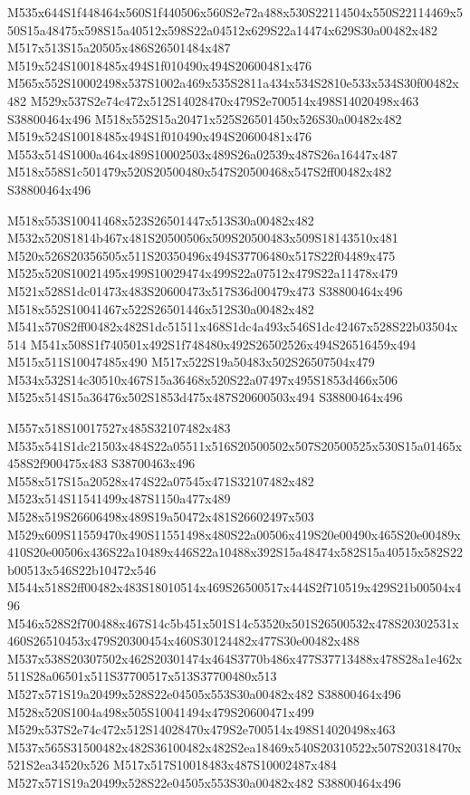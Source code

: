 \documentclass{article}
\begin{document}
\begin{multicols}{2}
M535x644S1f448464x560S1f440506x560S2e72a488x530S22114504x550S22114469x550S15a48475x598S15a40512x598S22a04512x629S22a14474x629S30a00482x482 M517x513S15a20505x486S26501484x487 M519x524S10018485x494S1f010490x494S20600481x476 M565x552S10002498x537S1002a469x535S2811a434x534S2810e533x534S30f00482x482 M529x537S2e74c472x512S14028470x479S2e700514x498S14020498x463 S38800464x496 M518x552S15a20471x525S26501450x526S30a00482x482 M519x524S10018485x494S1f010490x494S20600481x476 M553x514S1000a464x489S10002503x489S26a02539x487S26a16447x487 M518x558S1c501479x520S20500480x547S20500468x547S2ff00482x482 S38800464x496

M518x553S10041468x523S26501447x513S30a00482x482 M532x520S1814b467x481S20500506x509S20500483x509S18143510x481 M520x526S20356505x511S20350496x494S37706480x517S22f04489x475 M525x520S10021495x499S10029474x499S22a07512x479S22a11478x479 M521x528S1dc01473x483S20600473x517S36d00479x473 S38800464x496 M518x552S10041467x522S26501446x512S30a00482x482 M541x570S2ff00482x482S1dc51511x468S1dc4a493x546S1dc42467x528S22b03504x514 M541x508S1f740501x492S1f748480x492S26502526x494S26516459x494 M515x511S10047485x490 M517x522S19a50483x502S26507504x479 M534x532S14c30510x467S15a36468x520S22a07497x495S1853d466x506 M525x514S15a36476x502S1853d475x487S20600503x494 S38800464x496

M557x518S10017527x485S32107482x483 M535x541S1dc21503x484S22a05511x516S20500502x507S20500525x530S15a01465x458S2f900475x483 S38700463x496 M558x517S15a20528x474S22a07545x471S32107482x482 M523x514S11541499x487S1150a477x489 M528x519S26606498x489S19a50472x481S26602497x503 M529x609S11559470x490S11551498x480S22a00506x419S20e00490x465S20e00489x410S20e00506x436S22a10489x446S22a10488x392S15a48474x582S15a40515x582S22b00513x546S22b10472x546 M544x518S2ff00482x483S18010514x469S26500517x444S2f710519x429S21b00504x496 M546x528S2f700488x467S14c5b451x501S14c53520x501S26500532x478S20302531x460S26510453x479S20300454x460S30124482x477S30e00482x488 M537x538S20307502x462S20301474x464S3770b486x477S37713488x478S28a1e462x511S28a06501x511S37700517x513S37700480x513 M527x571S19a20499x528S22e04505x553S30a00482x482 S38800464x496 M528x520S1004a498x505S10041494x479S20600471x499 M529x537S2e74c472x512S14028470x479S2e700514x498S14020498x463 M537x565S31500482x482S36100482x482S2ea18469x540S20310522x507S20318470x521S2ea34520x526 M517x517S10018483x487S10002487x484 M527x571S19a20499x528S22e04505x553S30a00482x482 S38800464x496


\end{multicols}
\end{document}
